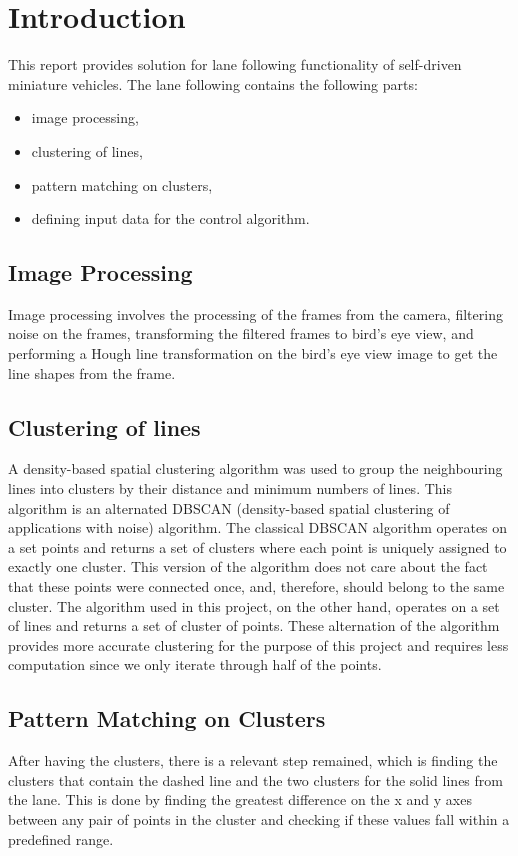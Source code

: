 \documentclass[Report.tex]{subfiles}
\begin{document}
\chapter{Introduction}
This report provides solution for lane following functionality of
self-driven miniature vehicles. The lane following contains the following parts:
\begin{itemize}
  \item image processing,
  \item clustering of lines,
  \item pattern matching on clusters,
  \item defining input data for the control algorithm.
\end{itemize}

\section{Image Processing} %
\label{sec:Image Processing}
Image processing involves the processing of the frames from the camera,
filtering noise on the frames, transforming the filtered frames to bird's
eye view, and performing a Hough line transformation on the bird's eye
view image to get the line shapes from the frame.

\section{Clustering of lines} %
\label{sec:Clustering of lines}
A density-based spatial clustering algorithm was used to group the
neighbouring lines into clusters by their distance and minimum numbers of
lines. This algorithm is an alternated DBSCAN (density-based spatial clustering of
applications with noise)\cite{www:dbscan} algorithm.
The classical DBSCAN algorithm operates on a set points and returns a set of
clusters where each point is uniquely assigned to exactly one cluster. This
version of the algorithm does not care about the fact that these points were
connected once, and, therefore, should belong to the same cluster. The
algorithm used in this project, on the other hand, operates on a set of lines
and returns a set of cluster of points. These alternation of the algorithm
provides more accurate clustering for the purpose of this project and requires
less computation since we only iterate through half of the points.

\section{Pattern Matching on Clusters} %
After having the clusters, there is a relevant step remained, which is finding
the clusters that contain the dashed line and the two clusters for the solid lines
from the lane. This is done by finding the greatest difference on the x and y
axes between any pair of points in the cluster and checking if these values
fall within a predefined range.
\end{document}

